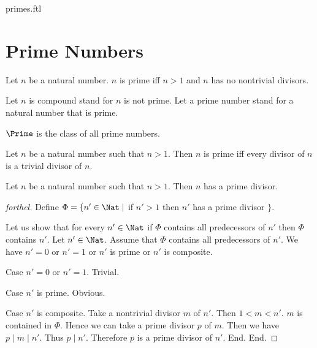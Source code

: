 \documentclass{naproche-library}
\begin{document}
\begin{smodule}{primes.ftl}


  \section*{Prime Numbers}

  \begin{definition}[forthel,id=ARITHMETIC_10_5450464558579712,printid]
    Let $n$ be a natural number.
    $n$ is prime iff $n > 1$ and $n$ has no nontrivial divisors.

    Let $n$ is compound stand for $n$ is not prime.
    Let a prime number stand for a natural number that is prime.
  \end{definition}

  \begin{definition}[forthel,id=ARITHMETIC_10_3834705971511296,printid]
    $\Prime$ is the class of all prime numbers.
  \end{definition}

  \begin{proposition}[forthel,id=ARITHMETIC_10_7801379464675328,printid]
    Let $n$ be a natural number such that $n > 1$.
    Then $n$ is prime iff every divisor of $n$ is a trivial divisor of $n$.
  \end{proposition}

  \begin{proposition}[forthel,id=ARITHMETIC_10_3606185106210816,printid]
    Let $n$ be a natural number such that $n > 1$.
    Then $n$ has a prime divisor.
  \end{proposition}
  \begin{proof}[forthel]
    Define $\Phi = \{ n' \in \Nat \mid$ if $n' > 1$ then $n'$ has a prime divisor $\}$.

    Let us show that for every $n' \in \Nat$ if $\Phi$ contains all
    predecessors of $n'$ then $\Phi$ contains $n'$.
      Let $n' \in \Nat$.
      Assume that $\Phi$ contains all predecessors of $n'$.
      We have $n' = 0$ or $n' = 1$ or $n'$ is prime or $n'$ is composite.

      Case $n' = 0$ or $n' = 1$. Trivial.

      Case $n'$ is prime. Obvious.

      Case $n'$ is composite.
        Take a nontrivial divisor $m$ of $n'$.
        Then $1 < m < n'$.
        $m$ is contained in $\Phi$.
        Hence we can take a prime divisor $p$ of $m$.
        Then we have $p \mid m \mid n'$.
        Thus $p \mid n'$.
        Therefore $p$ is a prime divisor of $n'$.
      End.
    End.


\end{proof}
\end{smodule}
\end{document}
